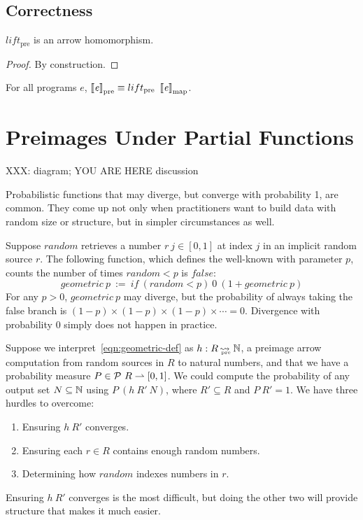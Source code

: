 \documentclass[preprint]{sigplanconf}
\newcommand{\arrow}{\rightsquigarrow}
\newcommand{\pto}{\rightharpoonup}
\newcommand{\arrowlift}{\ensuremath{lift}}
\newcommand{\map}{_\mathrm{map}}
\newcommand{\pre}{_\mathrm{pre}}
\DeclareMathOperator{\preto}{\arrow_{\mspace{-19mu}\pre}}
\newcommand{\liftpre}{\arrowlift\pre}
\begin{document}
\subsection{Correctness}

\begin{theorem}
$\liftpre$ is an arrow homomorphism.
\label{thm:liftpre-homomorphism}
\end{theorem}
\begin{proof}
By construction.
\end{proof}

\begin{corollary}
For all programs $\mathit{e}$, $\meaningof{\mathit{e}}\pre \equiv \liftpre~\meaningof{\mathit{e}}\map$.
\label{cor:preimage-arrow-correctness}
\end{corollary}

\section{Preimages Under Partial Functions}

XXX: diagram; YOU ARE HERE discussion

Probabilistic functions that may diverge, but converge with probability 1, are common.
They come up not only when practitioners want to build data with random size or structure, but in simpler circumstances as well.

Suppose $random$ retrieves a number $r~j \in [0,1]$ at index $j$ in an implicit random source $r$.
The following function, which defines the well-known  with parameter $p$, counts the number of times $random < p$ is $false$:
\begin{equation}
	geometric~p \ := \ if~(random < p)~0~(1 + geometric~p)
\label{eqn:geometric-def}
\end{equation}
For any $p > 0$, $geometric~p$ may diverge, but the probability of always taking the false branch is $(1-p) \times (1-p) \times (1-p) \times \cdots = 0$.
Divergence with probability $0$ simply does not happen in practice.

Suppose we interpret~\eqref{eqn:geometric-def} as $h : R \preto \Nat$, a preimage arrow computation from random sources in $R$ to natural numbers, and that we have a probability measure $P \in \powerset~R \pto [0,1]$.
We could compute the probability of any output set $N \subseteq \mathbb{N}$ using $P~(h~R'~N)$, where $R' \subseteq R$ and $P~R' = 1$. We have three hurdles to overcome:
\begin{enumerate}
	\item Ensuring $h~R'$ converges.
	\item Ensuring each $r \in R$ contains enough random numbers.
	\item Determining how $random$ indexes numbers in $r$.
\end{enumerate}
Ensuring $h~R'$ converges is the most difficult, but doing the other two will provide structure that makes it much easier.
\end{document}
